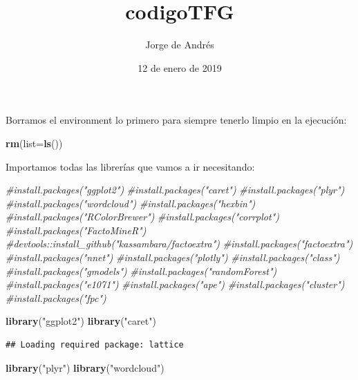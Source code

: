 \documentclass[]{article}
\title{codigoTFG}
\author{Jorge de Andrés}
\date{12 de enero de 2019}
\newenvironment{Shaded}{\begin{snugshade}}{\end{snugshade}}
\newcommand{\KeywordTok}[1]{\textcolor[rgb]{0.13,0.29,0.53}{\textbf{#1}}}
\newcommand{\DataTypeTok}[1]{\textcolor[rgb]{0.13,0.29,0.53}{#1}}
\newcommand{\StringTok}[1]{\textcolor[rgb]{0.31,0.60,0.02}{#1}}
\newcommand{\CommentTok}[1]{\textcolor[rgb]{0.56,0.35,0.01}{\textit{#1}}}
\newcommand{\NormalTok}[1]{#1}
\begin{document}
\maketitle

Borramos el environment lo primero para siempre tenerlo limpio en la
ejecución:

\begin{Shaded}
\begin{Highlighting}[]
\KeywordTok{rm}\NormalTok{(}\DataTypeTok{list=}\KeywordTok{ls}\NormalTok{())}
\end{Highlighting}
\end{Shaded}

Importamos todas las librerías que vamos a ir necesitando:

\begin{Shaded}
\begin{Highlighting}[]
\CommentTok{#install.packages("ggplot2")}
\CommentTok{#install.packages("caret")}
\CommentTok{#install.packages("plyr")}
\CommentTok{#install.packages("wordcloud")}
\CommentTok{#install.packages("hexbin")}
\CommentTok{#install.packages("RColorBrewer")}
\CommentTok{#install.packages("corrplot")}
\CommentTok{#install.packages("FactoMineR")}
\CommentTok{#devtools::install_github("kassambara/factoextra")}
\CommentTok{#install.packages("factoextra")}
\CommentTok{#install.packages("nnet")}
\CommentTok{#install.packages("plotly")}
\CommentTok{#install.packages("class")}
\CommentTok{#install.packages("gmodels")}
\CommentTok{#install.packages("randomForest")}
\CommentTok{#install.packages("e1071")}
\CommentTok{#install.packages("ape")}
\CommentTok{#install.packages("cluster")}
\CommentTok{#install.packages("fpc")}

\KeywordTok{library}\NormalTok{(}\StringTok{"ggplot2"}\NormalTok{)}
\KeywordTok{library}\NormalTok{(}\StringTok{"caret"}\NormalTok{)}
\end{Highlighting}
\end{Shaded}

\begin{verbatim}
## Loading required package: lattice
\end{verbatim}

\begin{Shaded}
\begin{Highlighting}[]
\KeywordTok{library}\NormalTok{(}\StringTok{"plyr"}\NormalTok{)}
\KeywordTok{library}\NormalTok{(}\StringTok{"wordcloud"}\NormalTok{)}
\end{Highlighting}
\end{Shaded}
\end{document}
